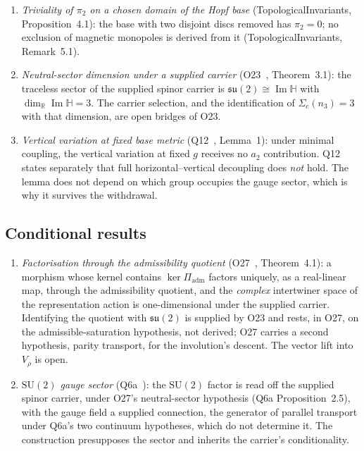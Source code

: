 \documentclass[11pt,a4paper]{article}
\theoremstyle{definition}
\newcommand{\SU}{\mathrm{SU}}
\newcommand{\su}{\mathfrak{su}}
\newcommand{\ImH}{\operatorname{Im}\mathbb{H}}
\begin{document}
      \begin{enumerate}
        \item \textit{Triviality of $\pi_2$ on a chosen domain of the Hopf base}
        (TopologicalInvariants, Proposition~4.1):
        the base with two disjoint discs removed has $\pi_2 = 0$; no exclusion of magnetic
        monopoles is derived from it (TopologicalInvariants, Remark~5.1).

        \item \textit{Neutral-sector dimension under a supplied carrier}
        (O23~\cite{Beau2026a27}, Theorem~3.1):
        the traceless sector of the supplied spinor carrier is $\su(2) \cong \ImH$ with
        $\dim_\mathbb{R} \ImH = 3$.
        The carrier selection, and the identification of $\Sigma_c(n_3) = 3$ with that dimension,
        are open bridges of O23.

        \item \textit{Vertical variation at fixed base metric} (Q12~\cite{Beau2026q12}, Lemma~1):
        under minimal coupling, the vertical variation at fixed $g$ receives no $a_2$ contribution.
        Q12 states separately that full horizontal--vertical decoupling does \emph{not} hold.
        The lemma does not depend on which group occupies the gauge sector, which is why it survives
        the withdrawal.
      \end{enumerate}

    \subsection{Conditional results}
      \label{sec:conditional}

      \begin{enumerate}
        \item \textit{Factorisation through the admissibility quotient}
        (O27~\cite{Beau2026a31}, Theorem~4.1):
        a morphism whose kernel contains $\ker \Pi_{\mathrm{adm}}$ factors uniquely, as a
        real-linear map, through the admissibility quotient, and the \emph{complex} intertwiner
        space of the representation action is one-dimensional under the supplied carrier.
        Identifying the quotient with $\su(2)$ is supplied by O23 and rests, in O27, on the
        admissible-saturation hypothesis, not derived; O27 carries a second hypothesis, parity
        transport, for the involution's descent.  The vector lift into $V_\rho$ is open.

        \item \textit{$\SU(2)$ gauge sector} (Q6a~\cite{Beau2026q6a}):
        the $\SU(2)$ factor is read off the supplied spinor carrier, under O27's neutral-sector
        hypothesis (Q6a Proposition~2.5), with the
        gauge field a supplied connection, the generator of parallel transport under Q6a's two
        continuum hypotheses, which do not determine it.
        The construction presupposes the sector and inherits the carrier's conditionality.
      \end{enumerate}
\end{document}
